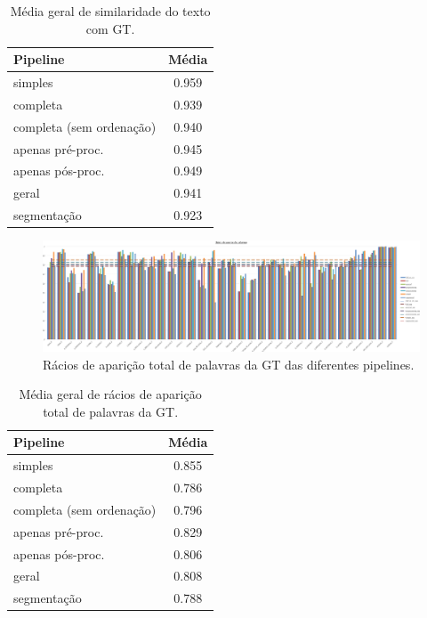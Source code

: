 \begin{table}[H]
	\centering
	\begin{tabular}{|l|c|}
		\hline
		\textbf{Pipeline} & \textbf{Média} \\ \hline
		simples & 0.959 				   \\ \hline
		completa & 0.939 				   \\ \hline
		completa (sem ordenação) & 0.940   \\ \hline
		apenas pré-proc. & 0.945 		   \\ \hline
		apenas pós-proc. & 0.949 		   \\ \hline
		geral & 0.941 					   \\ \hline
		segmentação & 0.923 			   \\ \hline
	\end{tabular}
	\caption{Média geral de similaridade do texto com GT.}
\end{table}



\begin{figure}[H]
	\centering
	\hspace*{-2cm}
	\includegraphics[width=1.1\textwidth]{images/resultados/graph_gt_word_hit_ratio.png}
	\caption{Rácios de aparição total de palavras da GT das diferentes pipelines.}
	\label{fig:graph_gt_word_hit_ratio}
\end{figure}


\begin{table}[H]
	\centering
	\begin{tabular}{|l|c|}
		\hline
		\textbf{Pipeline} & \textbf{Média} \\ \hline
		simples & 0.855 				   \\ \hline
		completa & 0.786 				   \\ \hline
		completa (sem ordenação) & 0.796   \\ \hline
		apenas pré-proc. & 0.829 		   \\ \hline
		apenas pós-proc. & 0.806 		   \\ \hline
		geral & 0.808 					   \\ \hline
		segmentação & 0.788 			   \\ \hline
	\end{tabular}
	\caption{Média geral de rácios de aparição total de palavras da GT.}
\end{table}




